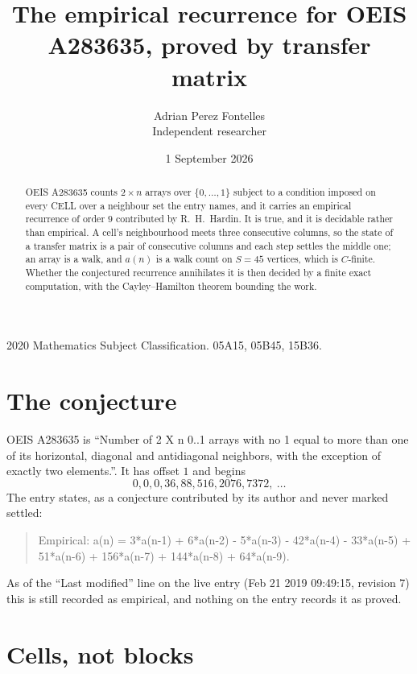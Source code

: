 \documentclass[11pt,a4paper]{article}
\title{The empirical recurrence for OEIS A283635, proved by transfer matrix}
\author{Adrian Perez Fontelles\\ \small Independent researcher}
\date{1 September 2026}
\theoremstyle{plain}
\theoremstyle{definition}
\begin{document}
\maketitle

\begin{abstract}
OEIS A283635 counts $2\times n$ arrays over $\{0,\dots,1\}$ subject to a condition imposed on
every CELL over a neighbour set the entry names, and it carries an empirical recurrence of
order $9$ contributed by R.~H.~Hardin. It is true, and it is decidable rather than
empirical. A cell's neighbourhood meets three consecutive columns, so the state of a transfer
matrix is a pair of consecutive columns and each step settles the middle one; an array is a
walk, and $a(n)$ is a walk count on $S=45$ vertices, which is $C$-finite. Whether the
conjectured recurrence annihilates it is then decided by a finite exact computation, with the
Cayley--Hamilton theorem bounding the work.
\end{abstract}

\noindent\small 2020 Mathematics Subject Classification. 05A15, 05B45, 15B36.\normalsize

\section{The conjecture}

OEIS A283635 is ``Number of 2 X n 0..1 arrays with no 1 equal to more than one of its horizontal, diagonal and antidiagonal neighbors, with the exception of exactly two elements.''. It has offset $1$ and begins
\[
0, 0, 0, 36, 88, 516, 2076, 7372,\ \dots
\]
The entry states, as a conjecture contributed by its author and never marked settled:
\begin{quote}
Empirical: a(n) = 3*a(n-1) + 6*a(n-2) - 5*a(n-3) - 42*a(n-4) - 33*a(n-5) + 51*a(n-6) + 156*a(n-7) + 144*a(n-8) + 64*a(n-9).
\end{quote}
As of the ``Last modified'' line on the live entry (Feb 21 2019 09:49:15, revision 7) this is still
recorded as empirical, and nothing on the entry records it as proved.

\section{Cells, not blocks}
\end{document}
